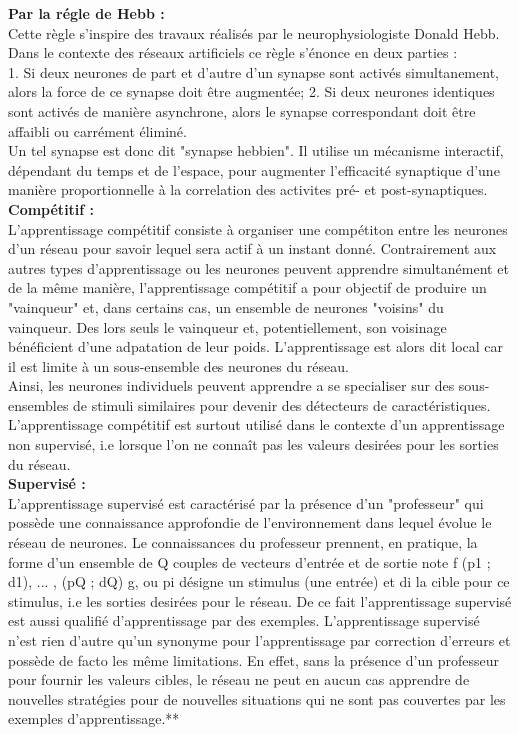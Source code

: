 \documentclass{article}
\begin{document}
\textbf{Par la régle de Hebb :}\\

Cette règle s’inspire des travaux réalisés par le neurophysiologiste Donald Hebb.
Dans le contexte des réseaux artificiels ce règle s’énonce en deux parties :\\

1. Si deux neurones de part et d’autre d’un synapse sont activés simultanement, alors la force de ce synapse doit être augmentée;
2. Si deux neurones identiques sont activés de manière asynchrone, alors le synapse
correspondant doit être affaibli ou carrément éliminé.\\

Un tel synapse est donc dit "synapse hebbien". Il utilise un mécanisme interactif, dépendant
du temps et de l’espace, pour augmenter l’efficacité synaptique d’une manière proportionnelle à la correlation des activites pré- et post-synaptiques. \\


\textbf{Compétitif  :}\\

L’apprentissage compétitif consiste à organiser une compétiton entre les neurones d’un réseau pour savoir lequel sera actif à un instant donné. Contrairement aux autres types d’apprentissage ou les neurones peuvent apprendre simultanément et de la même manière, l’apprentissage compétitif a pour objectif de produire un "vainqueur" et, dans certains cas, un ensemble de neurones "voisins" du vainqueur. Des lors seuls le vainqueur et, potentiellement, son voisinage bénéficient d’une adpatation de leur poids. L’apprentissage est alors dit local car il est limite à un sous-ensemble des neurones du réseau.\\

Ainsi, les neurones individuels peuvent apprendre a se specialiser sur des sous-ensembles de stimuli similaires pour devenir des détecteurs de caractéristiques.
L’apprentissage compétitif est surtout utilisé dans le contexte d’un apprentissage non
supervisé, i.e lorsque l’on ne connaît pas les valeurs desirées pour les sorties du réseau.\\


\textbf{Supervisé :}\\
L’apprentissage supervisé est caractérisé par la présence d’un "professeur" qui possède une connaissance approfondie de l’environnement dans lequel évolue le réseau de neurones. Le connaissances du professeur prennent, en pratique, la forme d’un ensemble de Q couples de vecteurs d’entrée et de sortie note f (p1 ; d1), ... , (pQ ; dQ) g, ou pi désigne un stimulus (une entrée) et di la cible pour ce stimulus, i.e les sorties desirées pour le réseau. De ce fait l’apprentissage supervisé est aussi qualifié d’apprentissage par des exemples. L’apprentissage supervisé n’est rien d’autre qu’un synonyme pour l’apprentissage par correction d’erreurs et possède de facto les même limitations. En effet, sans la présence d’un professeur pour fournir les valeurs cibles, le réseau ne peut en aucun cas apprendre de nouvelles stratégies pour de nouvelles situations qui ne sont pas couvertes par les exemples d’apprentissage.**
\end{document}
